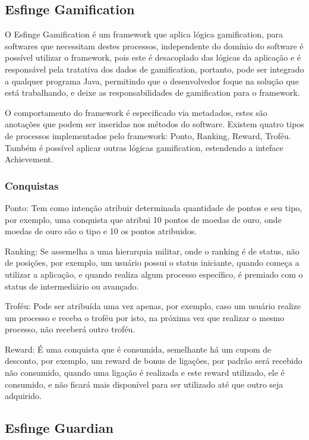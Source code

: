 \subsection{Esfinge Gamification}

\par O Esfinge Gamification é um framework que aplica lógica gamification, para softwares que necessitam destes processos, independente do domínio do software é possível utilizar o framework, pois este é desacoplado das lógicas da aplicação e é responsável pela tratativa dos dados de gamification, portanto, pode ser integrado a qualquer programa Java, permitindo que o desenvolvedor foque na solução que está trabalhando, e deixe as responsabilidades de gamification para o framework.
\par O comportamento do framework é especificado via metadados, estes são anotações que podem ser inseridas nos métodos do software. Existem quatro tipos de processos implementados pelo framework: Ponto, Ranking, Reward, Troféu. Também é possível aplicar outras lógicas gamification, estendendo a inteface Achievement.

\subsubsection{Conquistas}

\par Ponto: Tem como intenção atribuir determinada quantidade de pontos e seu tipo, por exemplo, uma conquista que atribui 10 pontos de moedas de ouro, onde moedas de ouro são o tipo e 10 os pontos atribuidos. 
\par Ranking: Se assemelha a uma hierarquia militar, onde o ranking é de status, não de posições, por exemplo, um usuário possui o status iniciante, quando começa a utilizar a aplicação, e quando realiza algum processo específico, é premiado com o status de intermediário ou avançado. 
\par Troféu: Pode ser atribuída uma vez apenas, por exemplo, caso um usuário realize um processo e receba o troféu por isto, na próxima vez que realizar o mesmo processo, não receberá outro troféu. 
\par Reward: É uma conquista que é consumida, semelhante há um cupom de desconto, por exemplo, um reward de bonus de ligações, por padrão será recebido não consumido, quando uma ligação é realizada e este reward utilizado, ele é consumido, e não ficará mais disponível para ser utilizado até que outro seja adquirido.

\subsection{Esfinge Guardian}
